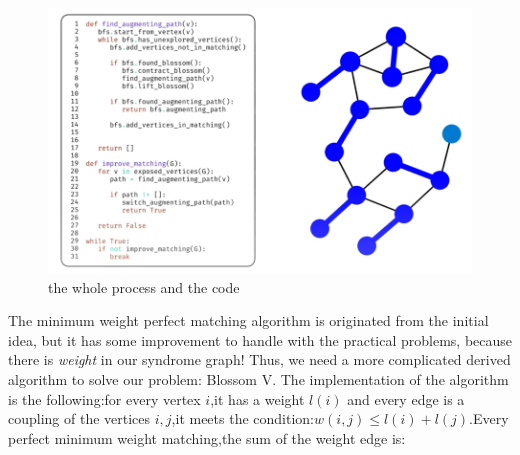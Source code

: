 \documentclass[
    a4paper, %
    10pt, %
    unnumberedsections, %
    twoside, %
]{LTJournalArticle}
\begin{document}
\begin{enumerate}
\begin{figure}
    \includegraphics[width=\linewidth]{img/blossom algorithm 9.png}
    \caption{the whole process and the code}
\end{figure}
\end{enumerate} 
The minimum weight perfect matching algorithm is originated from the initial idea,
but it has some improvement to handle with the practical problems, because there is \emph{weight} in our syndrome graph!
Thus, we need a more complicated derived algorithm to solve our problem: Blossom V.
The implementation of the algorithm is the following:for every vertex $i$,it has a weight $l(i)$ and every edge is a coupling of the vertices $i,j$,it meets the condition:$w(i,j) \leq l(i)+l(j)$.Every perfect minimum weight matching,the sum of the weight edge is:
\end{document}
